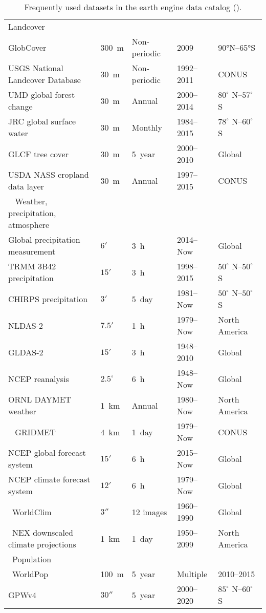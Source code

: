 \begin{table}[h]
\begin{tabularx}{\textwidth}{lXXXX}
		 Landcover		& & & & \\			
		 GlobCover	&300 m	&Non-periodic	&2009&	90°N–65°S\\
		 USGS National Landcover Database&	30 m	&Non-periodic	&1992–2011&	CONUS\\
		 UMD global forest change&	30 m&	Annual	&2000–2014&	$80^\circ$ N–$57^\circ$ S\\
		 JRC global surface water&	30 m&	Monthly	&1984–2015	&$78^\circ$ N–$60^\circ$ S\\
		 GLCF tree cover&	30 m	&5 year	&2000–2010	&Global\\
		 USDA NASS cropland data layer&	30 m&	Annual&	1997–2015&	CONUS\\
		  
		 Weather, precipitation, atmosphere	& & & & \\				
		 Global precipitation measurement& 	$6'$& 	3 h	& 2014–Now& 	Global\\
		 TRMM 3B42 precipitation& 	$15'$& 	3 h	& 1998–2015	& $50^\circ$ N–$50^\circ$ S\\
		 CHIRPS precipitation& 	$3'$& 	5 day& 	1981–Now& 	$50^\circ$ N–$50^\circ$ S\\
		 NLDAS-2& 	$7.5'$& 	1 h	& 1979–Now	& North America\\
		 GLDAS-2& 	$15'$& 	3 h	& 1948–2010	& Global\\
		 NCEP reanalysis& 	$2.5^\circ$ & 	6 h	& 1948–Now& 	Global\\
		 ORNL DAYMET weather& 	1 km& 	Annual& 1980–Now& 	North America\\
		  
		 GRIDMET&	4 km&	1 day&	1979–Now&	CONUS\\
		 NCEP global forecast system&	$15'$&	6 h&	2015–Now&	Global\\
		 NCEP climate forecast system&	$12'$	&6 h&	1979–Now&	Global\\
		 WorldClim	&$3''$ &	12 images&	1960–1990&	Global\\
		 NEX downscaled climate projections&	1 km&	1 day&	1950–2099&	North America\\
		 Population		& & & & \\		
		 WorldPop	&100 m	&5 year	&Multiple	& 2010–2015\\
		 GPWv4	& $30''$ &	5 year&	2000–2020&	$85^\circ$ N–$60^\circ$ S\\
		\bottomrule
	\end{tabularx}
	\caption{Frequently used datasets in the earth engine data catalog (\cite{gorelick2017google}).}
	\label{dependencies}
\end{table}
